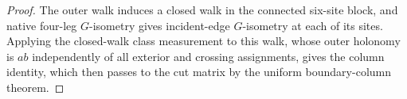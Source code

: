 \begin{proof}\leanok
    The outer walk induces a closed walk in the connected six-site
    block, and native four-leg $G$-isometry gives incident-edge $G$-isometry at each
    of its sites. Applying the closed-walk class measurement to this walk,
    whose outer holonomy is $ab$ independently of all exterior and
    crossing assignments, gives the column identity, which then passes to the
    cut matrix by the uniform boundary-column theorem.
\end{proof}
